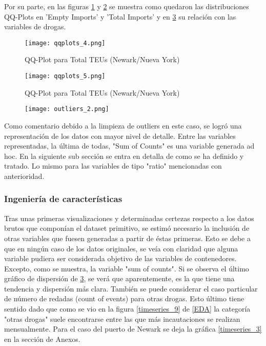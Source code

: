 \documentclass[12pt]{article}
\begin{document}
		Por su parte, en las figuras \ref{qqplots_4} y \ref{qqplots_5} se muestra como quedaron las distribuciones QQ-Plots en 'Empty Imports' y 'Total Imports' y en \ref{outliers_2} su relación con las variables de drogas.
		
		\begin{figure}[H]
			\caption{\label{qqplots_4} QQ-Plot para Total TEUs (Newark/Nueva York)}
			\centering
			\hspace*{1cm}
			\texttt{[image: qqplots\_4.png]}
		\end{figure}
	
		\begin{figure}[H]
			\caption{\label{qqplots_5} QQ-Plot para Total TEUs (Newark/Nueva York)}
			\centering
			\hspace*{1cm}
			\texttt{[image: qqplots\_5.png]}
		\end{figure}
	
		\begin{figure}[H]
			\caption{\label{outliers_2} }
			\centering
			\hspace*{1cm}
			\texttt{[image: outliers\_2.png]}
		\end{figure}
	
		Como comentario debido a la limpieza de outliers en este caso, se logró una representación de los datos con mayor nivel de detalle. Entre las variables representadas, la última de todas, "Sum of Counts" es una variable generada ad hoc. En la siguiente sub sección se entra en detalla de como se ha definido y tratado. Lo mismo para las variables de tipo "ratio" mencionadas con anterioridad.
	 
	
		\subsubsection{\label{feature engineering}Ingeniería de características}
		Tras unas primeras visualizaciones y determinadas certezas respecto a los datos brutos que componían el dataset primitivo, se estimó necesario la inclusión de otras variables que fuesen generadas a partir de éstas primeras.
		Esto se debe a que en ningún caso de los datos originales, se veía con claridad que alguna variable pudiera ser considerada objetivo de las variables de contenedores. Excepto, como se muestra, la variable "sum of counts". Si se observa el último gráfico de dispersión de \ref{outliers_2}, se verá que aparentemente, es la que tiene una tendencia y dispersión más clara. También se puede considerar el caso particular de número de redadas (count of events) para otras drogas. Esto último tiene sentido dado que como se vio en la figura \ref{timeseries_9} de \ref{EDA} la categoría "otras drogas" suele encontrarse entre las que más incautaciones se realizan mensualmente. Para el caso del puerto de Newark se deja la gráfica \ref{timeseries_3} en la sección de Anexos.
		
\end{document}
